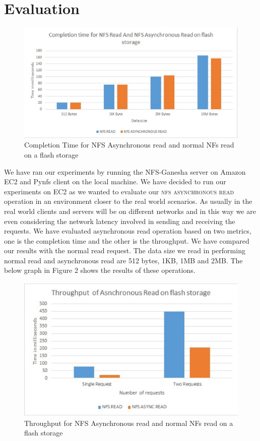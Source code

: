 \section{Evaluation}

	
\begin{figure}
\centering
\includegraphics[scale=1.0]{figures/completion_time.eps}
\caption{Completion	Time for NFS Asynchronous read and normal NFs read on a flash storage}
\label{fig:NFSCompletionTimes}
\end{figure}



	We have ran our experiments by running the NFS-Ganesha server on Amazon EC2 and Pynfs client on the local machine. We have decided to run our experiments on EC2 as we wanted to evaluate our \textsc{nfs asynchronous read} operation in an environment closer to the real world scenarios. As usually in the real world clients and servers will be on different networks and in this way we are even considering the network latency involved in sending and receiving the requests. We have evaluated asynchronous read operation based on two metrics, one is the completion time and the other is the throughput. We have compared our results with the normal read request. The data size we read in performing normal read and asynchronous read are 512 bytes, 1KB, 1MB and 2MB. The below graph in Figure 2 shows the results of these operations.

\begin{figure}
\centering
\includegraphics[scale=1.0]{figures/Throughput.eps}
\caption{Throughput for NFS Asynchronous read and normal NFs read on a flash storage}
\label{fig:NFSThroughput}
\end{figure}


